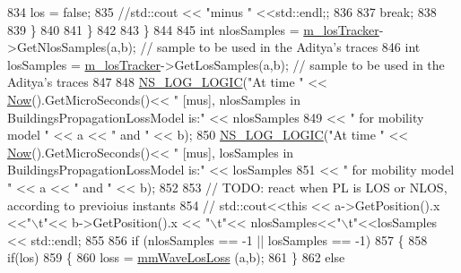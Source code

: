 \begin{DoxyCode}
834                                         los = \textcolor{keyword}{false};
835                                         \textcolor{comment}{//std::cout << "minus  " <<std::endl;;}
836 
837                                         \textcolor{keywordflow}{break};
838 
839                                 \}
840 
841                         \}
842 
843                 \}
844 
845                 \textcolor{keywordtype}{int} nlosSamples = \hyperlink{classns3_1_1BuildingsObstaclePropagationLossModel_a83f238f872f055847c5b938a3ac1ceaf}{m\_losTracker}->GetNlosSamples(a,b); \textcolor{comment}{// sample to be used in
       the Aditya's traces}
846                 \textcolor{keywordtype}{int} losSamples = \hyperlink{classns3_1_1BuildingsObstaclePropagationLossModel_a83f238f872f055847c5b938a3ac1ceaf}{m\_losTracker}->GetLosSamples(a,b); \textcolor{comment}{// sample to be used in the
       Aditya's traces}
847 
848                 \hyperlink{group__logging_ga88acd260151caf2db9c0fc84997f45ce}{NS\_LOG\_LOGIC}(\textcolor{stringliteral}{"At time "} << \hyperlink{group__simulator_gac3635e2e87f7ce316c89290ee1b01d0d}{Now}().GetMicroSeconds()<< \textcolor{stringliteral}{" [mus], nlosSamples in
       BuildingsPropagationLossModel is:"} << nlosSamples
849                         << \textcolor{stringliteral}{" for mobility model "} << a << \textcolor{stringliteral}{" and "} << b);
850                 \hyperlink{group__logging_ga88acd260151caf2db9c0fc84997f45ce}{NS\_LOG\_LOGIC}(\textcolor{stringliteral}{"At time "} << \hyperlink{group__simulator_gac3635e2e87f7ce316c89290ee1b01d0d}{Now}().GetMicroSeconds()<< \textcolor{stringliteral}{" [mus], losSamples in
       BuildingsPropagationLossModel is:"} << losSamples
851                         << \textcolor{stringliteral}{" for mobility model "} << a << \textcolor{stringliteral}{" and "} << b);
852 
853                 \textcolor{comment}{// TODO: react when PL is LOS or NLOS, according to previoius instants}
854         \textcolor{comment}{//       std::cout<<this <<  a->GetPosition().x <<"\(\backslash\)t"<< b->GetPosition().x << "\(\backslash\)t"<<
       nlosSamples<<"\(\backslash\)t"<<losSamples << std::endl;}
855 
856                 \textcolor{keywordflow}{if} (nlosSamples == -1 || losSamples == -1)
857                 \{
858                         \textcolor{keywordflow}{if}(los)
859                         \{
860                                 loss = \hyperlink{classns3_1_1BuildingsObstaclePropagationLossModel_ad689fe28aa4e050953598741fa1a627c}{mmWaveLosLoss} (a,b);
861                         \}
862                         \textcolor{keywordflow}{else}

\end{DoxyCode}
